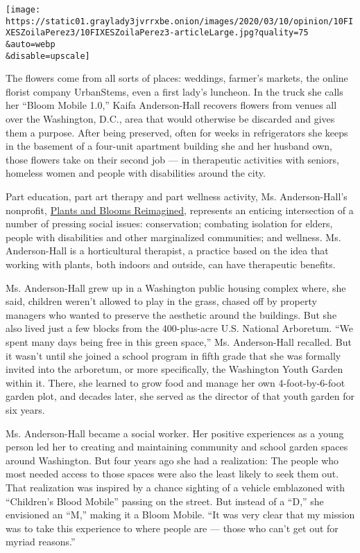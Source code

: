 \texttt{[image: https://static01.graylady3jvrrxbe.onion/images/2020/03/10/opinion/10FIXESZoilaPerez3/10FIXESZoilaPerez3-articleLarge.jpg?quality=75\\\&auto=webp\\\&disable=upscale]}

The flowers come from all sorts of places: weddings, farmer's markets,
the online florist company UrbanStems, even a first lady's luncheon. In
the truck she calls her ``Bloom Mobile 1.0,'' Kaifa Anderson-Hall
recovers flowers from venues all over the Washington, D.C., area that
would otherwise be discarded and gives them a purpose. After being
preserved, often for weeks in refrigerators she keeps in the basement of
a four-unit apartment building she and her husband own, those flowers
take on their second job --- in therapeutic activities with seniors,
homeless women and people with disabilities around the city.

Part education, part art therapy and part wellness activity, Ms.
Anderson-Hall's nonprofit,
\href{http://www.plantsandbloomsreimagined.org/p/home.html}{Plants and
Blooms Reimagined}, represents an enticing intersection of a number of
pressing social issues: conservation; combating isolation for elders,
people with disabilities and other marginalized communities; and
wellness. Ms. Anderson-Hall is a horticultural therapist, a practice
based on the idea that working with plants, both indoors and outside,
can have therapeutic benefits.

Ms. Anderson-Hall grew up in a Washington public housing complex where,
she said, children weren't allowed to play in the grass, chased off by
property managers who wanted to preserve the aesthetic around the
buildings. But she also lived just a few blocks from the 400-plus-acre
U.S. National Arboretum. ``We spent many days being free in this green
space,'' Ms. Anderson-Hall recalled. But it wasn't until she joined a
school program in fifth grade that she was formally invited into the
arboretum, or more specifically, the Washington Youth Garden within it.
There, she learned to grow food and manage her own 4-foot-by-6-foot
garden plot, and decades later, she served as the director of that youth
garden for six years.

Ms. Anderson-Hall became a social worker. Her positive experiences as a
young person led her to creating and maintaining community and school
garden spaces around Washington. But four years ago she had a
realization: The people who most needed access to those spaces were also
the least likely to seek them out. That realization was inspired by a
chance sighting of a vehicle emblazoned with ``Children's Blood Mobile''
passing on the street. But instead of a ``D,'' she envisioned an ``M,''
making it a Bloom Mobile. ``It was very clear that my mission was to
take this experience to where people are --- those who can't get out for
myriad reasons.''

